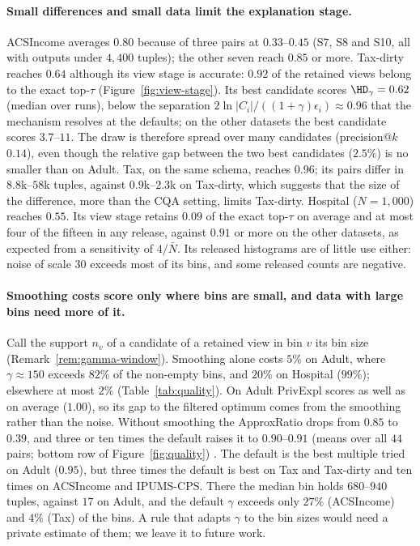 \paragraph{Small differences and small data limit the explanation stage.}
ACSIncome averages $0.80$  because of three pairs at $0.33$--$0.45$ (S7, S8 and S10, all with outputs under $4{,}400$ tuples); the other seven reach $0.85$ or more.
Tax-dirty reaches $0.64$ although its view stage is accurate: $0.92$ of the retained views belong to the exact top-$\tau$ (Figure~\ref{fig:view-stage}).
Its best candidate scores $\HD_\gamma=0.62$ (median over runs), below the separation $2\ln|C_i|/((1+\gamma)\epsilon_i)\approx0.96$ that the mechanism resolves at the defaults; on the other datasets the best candidate scores $3.7$--$11$.
The draw is therefore spread over many candidates (precision@$k$ $0.14$), even though the relative gap between the two best candidates ($2.5\%$) is no smaller than on Adult.
Tax, on the same schema, reaches $0.96$; its pairs differ in $8.8$k--$58$k tuples, against $0.9$k--$2.3$k on Tax-dirty, which suggests that the size of the difference, more than the CQA setting, limits Tax-dirty.
Hospital ($N=1{,}000$) reaches $0.55$.
Its view stage retains $0.09$ of the exact top-$\tau$ on average and at most four of the fifteen in any release, against $0.91$ or more on the other datasets, as expected from a sensitivity of $4/\bar N$.
Its released histograms are of little use either: noise of scale $30$ exceeds most of its bins, and some released counts are negative.

\paragraph{Smoothing costs score only where bins are small, and data with large bins need more of it.}
Call the support $n_v$ of a candidate of a retained view in bin $v$ its bin size (Remark~\ref{rem:gamma-window}).
Smoothing alone costs \Bone{} $5\%$ on Adult, where $\gamma\approx150$ exceeds $82\%$ of the non-empty bins, and $20\%$ on Hospital ($99\%$); elsewhere at most $2\%$ (Table~\ref{tab:quality}).
On Adult \textsf{PrivExpl} scores as well as \Bone{} on average ($1.00$), so its gap to the filtered optimum comes from the smoothing rather than the noise.
Without smoothing the ApproxRatio drops from $0.85$ to $0.39$, and three or ten times the default raises it to $0.90$--$0.91$ (means over all $44$ pairs; bottom row of Figure~\ref{fig:quality}) .
The default is the best multiple tried on Adult ($0.95$), but three times the default is best on Tax and Tax-dirty and ten times on ACSIncome and IPUMS-CPS.
There the median bin holds $680$--$940$ tuples, against $17$ on Adult, and the default $\gamma$ exceeds only $27\%$ (ACSIncome) and $4\%$ (Tax) of the bins.
A rule that adapts $\gamma$ to the bin sizes would need a private estimate of them; we leave it to future work.

